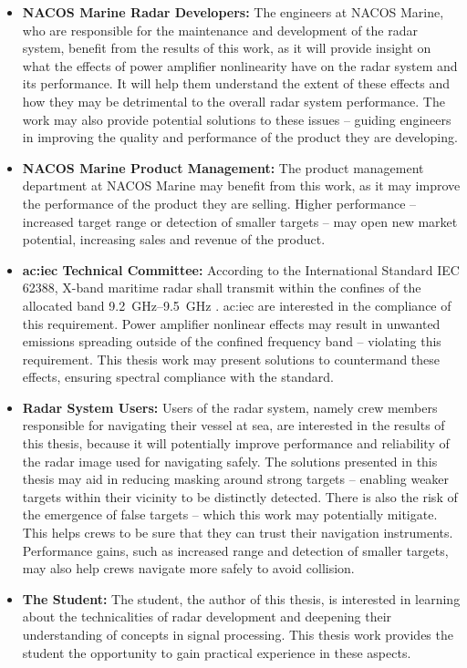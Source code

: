 \begin{itemize}
    \item \textbf{NACOS Marine Radar Developers:} The engineers at NACOS Marine, who are responsible for the maintenance and development of the radar system, benefit from the results of this work, as it will provide insight on what the effects of power amplifier nonlinearity have on the radar system and its performance. It will help them understand the extent of these effects and how they may be detrimental to the overall radar system performance. The work may also provide potential solutions to these issues – guiding engineers in improving the quality and performance of the product they are developing.
    \item \textbf{NACOS Marine Product Management:} The product management department at NACOS Marine may benefit from this work, as it may improve the performance of the product they are selling. Higher performance – increased target range or detection of smaller targets – may open new market potential, increasing sales and revenue of the product. 
    \item \textbf{\gls{ac:iec} Technical Committee:} According to the International Standard IEC 62388, X-band maritime radar shall transmit within the confines of the allocated band \qtyrange{9.2}{9.5}{\giga\hertz} \cite[Sec.~6.2.1.1]{iec}. \gls{ac:iec} are interested in the compliance of this requirement. Power amplifier nonlinear effects may result in unwanted emissions spreading outside of the confined frequency band – violating this requirement. This thesis work may present solutions to countermand these effects, ensuring spectral compliance with the standard.
    \item \textbf{Radar System Users:} Users of the radar system, namely crew members responsible for navigating their vessel at sea, are interested in the results of this thesis, because it will potentially improve performance and reliability of the radar image used for navigating safely. The solutions presented in this thesis may aid in reducing masking around strong targets – enabling weaker targets within their vicinity to be distinctly detected. There is also the risk of the emergence of false targets – which this work may potentially mitigate. This helps crews to be sure that they can trust their navigation instruments. Performance gains, such as increased range and detection of smaller targets, may also help crews navigate more safely to avoid collision.
    \item \textbf{The Student:} The student, the author of this thesis, is interested in learning about the technicalities of radar development and deepening their understanding of concepts in signal processing. This thesis work provides the student the opportunity to gain practical experience in these aspects.
\end{itemize}

